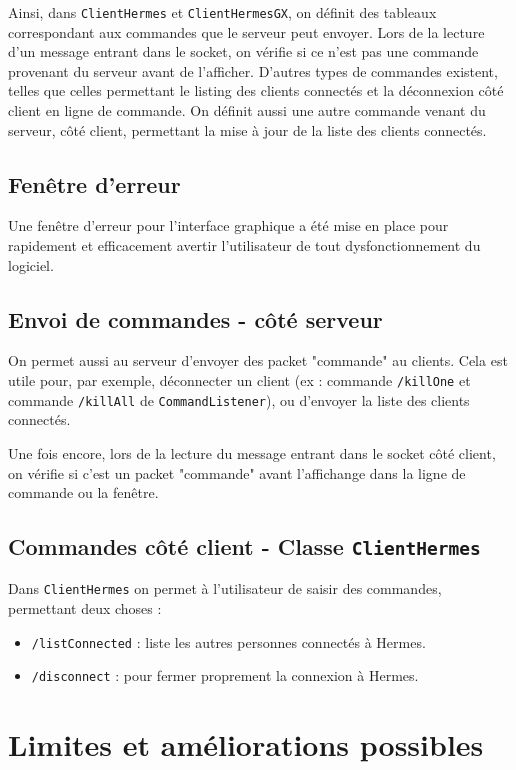 \documentclass{article}
\begin{document}
Ainsi, dans \texttt{ClientHermes} et \texttt{ClientHermesGX}, on définit des tableaux correspondant aux commandes que le serveur 
peut envoyer. Lors de la lecture d'un message entrant dans le socket, on vérifie si ce n'est pas une commande provenant du serveur avant de l'afficher.
D'autres types de commandes existent, telles que celles permettant le listing des clients connectés et la déconnexion côté client en ligne de commande. 
On définit aussi une autre commande venant du serveur, côté client, permettant la mise à jour de la liste des clients connectés. 

\subsection{Fenêtre d'erreur}

Une fenêtre d'erreur pour l'interface graphique a été mise en place pour rapidement et efficacement avertir l'utilisateur 
de tout dysfonctionnement du logiciel. 

\subsection{Envoi de commandes - côté serveur}

On permet aussi au serveur d'envoyer des packet "commande" au clients. 
Cela est utile pour, par exemple, déconnecter un client (ex : commande \texttt{/killOne} et commande \texttt{/killAll} de \texttt{CommandListener}),
ou d'envoyer la liste des clients connectés. 

Une fois encore, lors de la lecture du message entrant dans le socket côté client, on vérifie si c'est un packet "commande" 
avant l'affichange dans la ligne de commande ou la fenêtre. 


\subsection{Commandes côté client - Classe \texttt{ClientHermes}}

Dans \texttt{ClientHermes} on permet à l'utilisateur de saisir des commandes, permettant deux choses :
\begin{itemize}
    \item \texttt{/listConnected} : liste les autres personnes connectés à Hermes. 
    \item \texttt{/disconnect} : pour fermer proprement la connexion à Hermes. 
\end{itemize}


\section{Limites et améliorations possibles}
\end{document}
